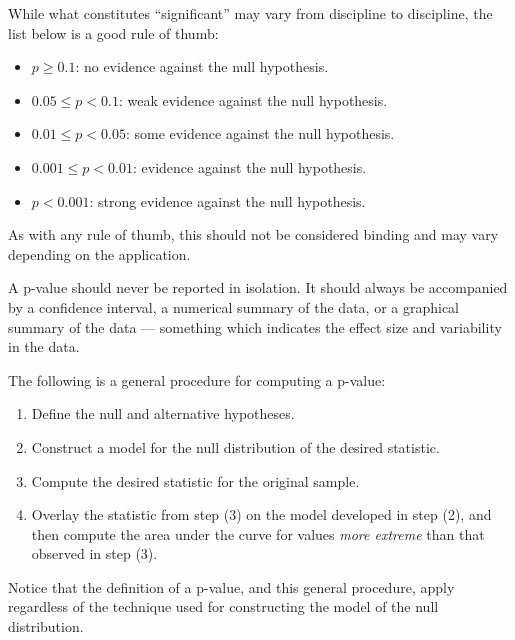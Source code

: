 \documentclass[
]{book}
\providecommand{\tightlist}{%
  \setlength{\itemsep}{0pt}\setlength{\parskip}{0pt}}
\theoremstyle{plain}
\theoremstyle{mydefn}
\theoremstyle{myexmpl}
\theoremstyle{remark}
\begin{document}
\begin{rmdtip}
While what constitutes ``significant'' may vary from discipline to discipline, the list below is a good rule of thumb:

\begin{itemize}
\tightlist
\item
  \(p \geq 0.1\): no evidence against the null hypothesis.
\item
  \(0.05 \leq p < 0.1\): weak evidence against the null hypothesis.
\item
  \(0.01 \leq p < 0.05\): some evidence against the null hypothesis.
\item
  \(0.001 \leq p < 0.01\): evidence against the null hypothesis.
\item
  \(p < 0.001\): strong evidence against the null hypothesis.
\end{itemize}

As with any rule of thumb, this should not be considered binding and may vary depending on the application.
\end{rmdtip}

\begin{rmdtip}
A p-value should never be reported in isolation. It should always be accompanied by a confidence interval, a numerical summary of the data, or a graphical summary of the data --- something which indicates the effect size and variability in the data.
\end{rmdtip}

\begin{rmdtip}
The following is a general procedure for computing a p-value:

\begin{enumerate}
\def\labelenumi{\arabic{enumi}.}
\tightlist
\item
  Define the null and alternative hypotheses.
\item
  Construct a model for the null distribution of the desired statistic.
\item
  Compute the desired statistic for the original sample.
\item
  Overlay the statistic from step (3) on the model developed in step (2), and then compute the area under the curve for values \emph{more extreme} than that observed in step (3).
\end{enumerate}

Notice that the definition of a p-value, and this general procedure, apply regardless of the technique used for constructing the model of the null distribution.
\end{rmdtip}
\end{document}
